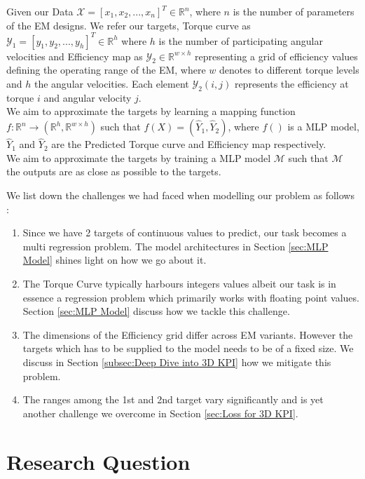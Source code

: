 \documentclass{report} %
\begin{document}
Given our Data $\mathcal{X}  = [x_1, x_2, ..., x_{n}]^T \in \mathbb{R}^{n}$, where $n$ is the number of parameters of the \ac{EM} designs. 
We refer our targets, Torque curve as $\mathcal{Y}_1 = [y_1, y_2, ..., y_{h}]^T \in \mathbb{R}^{h}$ where $h$ is the number of participating angular velocities and
Efficiency map as $\mathcal{Y}_2 \in \mathbb{R}^{w \times h}$ representing a grid of efficiency values defining the operating range of the \ac{EM}, where $w$ denotes to 
different torque levels and $h$ the angular velocities. Each element $\mathcal{Y}_2(i,j)$ represents the efficiency at torque $i$ and angular velocity $j$.\\ 
We aim to approximate the targets by learning a mapping function $f : \mathbb{R}^n \to (\mathbb{R}^h, \mathbb{R}^{w \times h})$
such that $f(X) = (\hat{Y}_1, \hat{Y}_2)$, where \(f()\) is a \ac{MLP} model, \(\hat{Y}_1\) and \(\hat{Y}_2\) are the Predicted Torque curve and Efficiency map respectively.\\
We aim to approximate the targets by training a \ac{MLP} model $\mathcal{M}$ such that $\mathcal{M}$ the outputs are as close as possible to the targets.

We list down the challenges we had faced when modelling our problem as follows : 
\begin{enumerate}
    \item Since we have 2 targets of continuous values to predict, our task becomes a multi regression problem. The model architectures in Section \ref{sec:MLP Model} 
    shines light on how we go about it.
    \item The Torque Curve typically harbours integers values albeit our task is in essence a regression problem which primarily works with floating point values. 
    Section \ref{sec:MLP Model} discuss how we tackle this challenge. 
    \item The dimensions of the Efficiency grid differ across \ac{EM} variants. However the targets which has to be supplied to the model needs to be of a fixed size.
     We discuss in Section \ref{subsec:Deep Dive into 3D KPI} how we mitigate this problem.
    \item The ranges among the 1st and 2nd target vary significantly and is yet another challenge we overcome in Section \ref{sec:Loss for 3D KPI}.
\end{enumerate}

\section{Research Question}\label{sec:Research Question}
\end{document}
